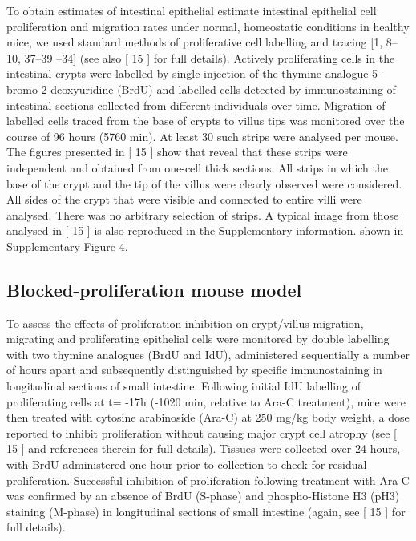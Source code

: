 \documentclass[10pt,letterpaper]{article}
\providecommand{\DIFaddtex}[1]{{\protect\color{blue} \sf #1}} %
\providecommand{\DIFdeltex}[1]{{\protect\color{red} \scriptsize #1}} %
\providecommand{\DIFaddbegin}{} %
\providecommand{\DIFaddend}{} %
\providecommand{\DIFdelbegin}{} %
\providecommand{\DIFdelend}{} %
\providecommand{\DIFadd}[1]{\texorpdfstring{\DIFaddtex{#1}}{#1}} %
\providecommand{\DIFdel}[1]{\texorpdfstring{\DIFdeltex{#1}}{}} %
\begin{document}
To \DIFdelbegin \DIFdel{obtain estimates of intestinal epithelial }\DIFdelend \DIFaddbegin \DIFadd{estimate intestinal epithelial cell }\DIFaddend proliferation and migration rates
under normal, homeostatic conditions in healthy mice, we used standard
methods of proliferative cell labelling and tracing {[}1, 8--10,
\DIFdelbegin \DIFdel{37--39}\DIFdelend \DIFaddbegin \DIFadd{32--34}\DIFaddend {]} (see also {[}\DIFdelbegin \DIFdel{15}\DIFdelend \DIFaddbegin \DIFadd{18}\DIFaddend {]} for full details). Actively proliferating
cells in the intestinal crypts were labelled by single injection of the
thymine analogue 5-bromo-2-deoxyuridine (BrdU) and labelled cells
detected by immunostaining of intestinal sections collected from
different individuals over time. Migration of labelled cells traced from
the base of crypts to villus tips was monitored over the course of 96
hours (5760 min). At least 30 \DIFaddbegin \DIFadd{such }\DIFaddend strips were analysed per mouse. The
figures presented in {[}\DIFdelbegin \DIFdel{15}\DIFdelend \DIFaddbegin \DIFadd{18}\DIFaddend {]} \DIFdelbegin \DIFdel{show that }\DIFdelend \DIFaddbegin \DIFadd{reveal that these }\DIFaddend strips were independent
and obtained from one-cell thick sections. All strips in which the base
of the crypt and the tip of the villus were clearly observed were
considered. All sides of the crypt that were visible and connected to
entire villi were analysed. \DIFdelbegin \DIFdel{There was no arbitrary
selection of strips. }\DIFdelend A typical image from those analysed in
{[}\DIFdelbegin \DIFdel{15}\DIFdelend \DIFaddbegin \DIFadd{18}\DIFaddend {]} is \DIFdelbegin \DIFdel{also reproduced in the Supplementary information.
}\DIFdelend \DIFaddbegin \DIFadd{shown in Supplementary Figure 4.
}\DIFaddend 

\subsection{Blocked-proliferation mouse
model}\label{blocked-proliferation-mouse-model}

To assess the effects of proliferation inhibition on crypt/villus
migration, migrating and proliferating epithelial cells were monitored
by double labelling with two thymine analogues (BrdU and IdU),
administered sequentially a number of hours apart and subsequently
distinguished by specific immunostaining in longitudinal sections of
small intestine. Following initial IdU labelling of proliferating cells
at t= -17h (-1020 min, relative to Ara-C treatment), mice were then
treated with cytosine arabinoside (Ara-C) at 250 mg/kg body weight, a
dose reported to inhibit proliferation without causing major crypt cell
atrophy (see {[}\DIFdelbegin \DIFdel{15}\DIFdelend \DIFaddbegin \DIFadd{18}\DIFaddend {]} and references therein for \DIFdelbegin \DIFdel{full }\DIFdelend details). Tissues were
collected over 24 hours, with BrdU administered one hour prior to
collection to check for residual proliferation. Successful inhibition of
proliferation following treatment with Ara-C was confirmed by an absence
of BrdU (S-phase) and phospho-Histone H3 (pH3) staining (M-phase) in
longitudinal sections of small intestine (again, see {[}\DIFdelbegin \DIFdel{15}\DIFdelend \DIFaddbegin \DIFadd{18}\DIFaddend {]} for full
details).
\end{document}
